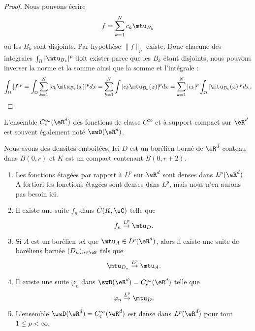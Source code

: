 \begin{proof}
	Nous pouvons écrire
	\begin{equation}
		f=\sum_{k=1}^Nc_k\mtu_{B_k}
	\end{equation}
	où les \( B_k\) sont disjoints. Par hypothèse \( \| f \|_p\) existe. Donc chacune des intégrales \( \int_{\Omega}| \mtu_{B_k} |^p\) doit exister parce que les \( B_k\) étant disjoints, nous pouvons inverser la norme et la somme ainsi que la somme et l'intégrale :
	\begin{equation}
		\int_{\Omega}|f|^p=\int_{\Omega}\sum_{k=1}^N| c_k\mtu_{B_k}(x) |^pdx=\sum_{k=1}^N\int| c_k\mtu_{B_k}(x) |^pdx=\sum_{k=1}^N| c_k |^p\int_{\Omega}| \mtu_{B_k}(x) |^pdx.
	\end{equation}
\end{proof}

L'ensemble \(  C^{\infty}_c(\eR^d)\) des fonctions de classe \(  C^{\infty}\) et à support compact sur \( \eR^d\) est souvent également noté \( \swD(\eR^d)\).
\begin{theorem} \label{ThoILGYXhX}
	Nous avons des densités emboitées. Ici \( D\) est un borélien borné de \( \eR^d\) contenu dans \( B(0,r)\) et \( K\) est un compact contenant \( B(0,r+2)\).
	\begin{enumerate}
		\item
		      Les fonctions étagées par rapport à \( L^p\) sur \( \eR^d\) sont denses dans \( L^p(\eR^d)\). A fortiori les fonctions étagées sont denses dans \( L^p\), mais nous n'en aurons pas besoin ici.
		\item\label{ItemYVFVrOIii}
		      Il existe une suite \( f_n\) dans \(  C(K,\eC)\) telle que
		      \begin{equation}
			      f_n\stackrel{L^p}{\to}\mtu_{D}.
		      \end{equation}
		\item\label{ItemYVFVrOIiii}
		      Si \( A\) est un borélien tel que \( \mtu_A\in L^p(\eR^d)\), alors il existe une suite de boréliens bornée \( (D_n)_{n\in \eN}\) tels que
		      \begin{equation}
			      \mtu_{D_n}\stackrel{L^p}{\to}\mtu_A.
		      \end{equation}
		\item\label{ItemYVFVrOIiv}
		      Il existe une suite \( \varphi_n\) dans \( \swD(\eR^d)=  C^{\infty}_c(\eR^d)\) telle que
		      \begin{equation}
			      \varphi_n\stackrel{L^p}{\to}\mtu_{D}.
		      \end{equation}

		\item\label{ItemYVFVrOIv}
		      L'ensemble \(\swD(\eR^d)= C^{\infty}_c(\eR^d)\) est dense dans \( L^p(\eR^d)\) pour tout \( 1\leq p<\infty\).
	\end{enumerate}
\end{theorem}

